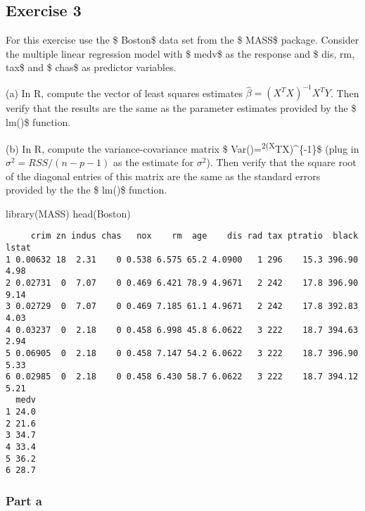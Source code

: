 \documentclass[
  letterpaper,
  DIV=11,
  numbers=noendperiod]{scrartcl}
\newenvironment{Shaded}{\begin{snugshade}}{\end{snugshade}}
\newcommand{\FunctionTok}[1]{\textcolor[rgb]{0.28,0.35,0.67}{#1}}
\newcommand{\NormalTok}[1]{\textcolor[rgb]{0.00,0.23,0.31}{#1}}
\begin{document}
\hypertarget{exercise-3}{%
\subsection{Exercise 3}\label{exercise-3}}

For this exercise use the \$ Boston\$ data set from the \$ MASS\$
package. Consider the multiple linear regression model with \$ medv\$ as
the response and \$ dis, rm, tax\$ and \$ chas\$ as predictor variables.

(a) In R, compute the vector of least squares estimates
\(\hat\beta=(X^TX)^{-1}X^TY\). Then verify that the results are the same
as the parameter estimates provided by the \$ lm()\$ function.

(b) In R, compute the variance-covariance matrix \$
Var(\hat\beta)=\sigma\textsuperscript{2(X}TX)\^{}\{-1\}\$ (plug in
\(\sigma^2= RSS/(n-p-1)\) as the estimate for \(\sigma^2\)). Then verify
that the square root of the diagonal entries of this matrix are the same
as the standard errors provided by the the \$ lm()\$ function.

\begin{Shaded}
\begin{Highlighting}[]
\FunctionTok{library}\NormalTok{(MASS)}
\FunctionTok{head}\NormalTok{(Boston)}
\end{Highlighting}
\end{Shaded}

\begin{verbatim}
     crim zn indus chas   nox    rm  age    dis rad tax ptratio  black lstat
1 0.00632 18  2.31    0 0.538 6.575 65.2 4.0900   1 296    15.3 396.90  4.98
2 0.02731  0  7.07    0 0.469 6.421 78.9 4.9671   2 242    17.8 396.90  9.14
3 0.02729  0  7.07    0 0.469 7.185 61.1 4.9671   2 242    17.8 392.83  4.03
4 0.03237  0  2.18    0 0.458 6.998 45.8 6.0622   3 222    18.7 394.63  2.94
5 0.06905  0  2.18    0 0.458 7.147 54.2 6.0622   3 222    18.7 396.90  5.33
6 0.02985  0  2.18    0 0.458 6.430 58.7 6.0622   3 222    18.7 394.12  5.21
  medv
1 24.0
2 21.6
3 34.7
4 33.4
5 36.2
6 28.7
\end{verbatim}

\hypertarget{part-a}{%
\subsubsection{Part a}\label{part-a}}
\end{document}
